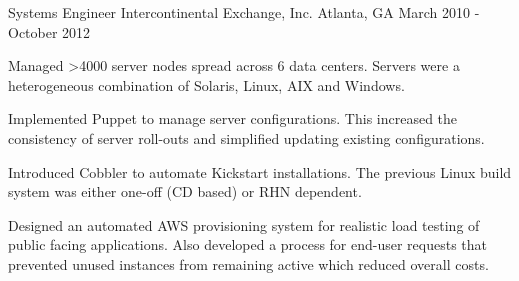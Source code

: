 \begin{cventries}
  \cventry
    {Systems Engineer} %
    {Intercontinental Exchange, Inc.} %
    {Atlanta, GA} %
    {March 2010 - October 2012} %
    {
      \begin{cvitems}
        \item {Managed >4000 server nodes spread across 6 data centers. Servers were a heterogeneous combination of Solaris, Linux, AIX and Windows.}
        \item {Implemented Puppet to manage server configurations. This increased the consistency of server roll-outs and simplified updating existing configurations.}
        \item {Introduced Cobbler to automate Kickstart installations. The previous Linux build system was either one-off (CD based) or RHN dependent.}
        \item {Designed an automated AWS provisioning system for realistic load testing of public facing applications. Also developed a process for end-user requests that prevented unused instances from remaining active which reduced overall costs.}
      \end{cvitems}
    }





\end{cventries}
